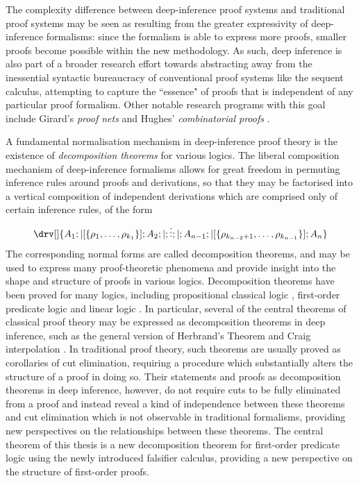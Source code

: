 \documentclass[10pt]{article}
\theoremstyle{definition}\newtheorem{remark}[theorem]{Remark}
\theoremstyle{definition}\newtheorem{example}[theorem]{Example}
\theoremstyle{definition}\newtheorem{definition}[theorem]{Definition}
\begin{document}
	The complexity difference between deep-inference proof systems and traditional proof systems may be seen as resulting from the greater expressivity of deep-inference formalisms: since the formalism is able to express more proofs, smaller proofs become possible within the new methodology. As such, deep inference is also part of a broader research effort towards abstracting away from the inessential syntactic bureaucracy of conventional proof systems like the sequent calculus, attempting to capture the ``essence" of proofs that is independent of any particular proof formalism. Other notable research programs with this goal include Girard's \textit{proof nets} \cite{GirardLinearLogic} and Hughes' \textit{combinatorial proofs} \cite{HughesFirstOrderCombinatorialProofs, HughesProofsWithoutSyntax, HughesCombinatorialProofsDecomposition}.
	
	A fundamental normalisation mechanism in deep-inference proof theory is the existence of \textit{decomposition theorems} for various logics. The liberal composition mechanism of deep-inference formalisms allows for great freedom in permuting inference rules around proofs and derivations, so that they may be factorised into a vertical composition of independent derivations which are comprised only of certain inference rules, of the form
	\[
		\drv[] {
			A_1 ; |[\{\rho_1, \dots, \rho_{k_1}\}] ; A_2 ; | ; \vdots ; | ; A_{n - 1} ; |[\{\rho_{k_{n - 2} + 1}, \dots, \rho_{k_{n - 1}}\}] ; A_n
		}
	\]
	The corresponding normal forms are called decomposition theorems, and may be used to express many proof-theoretic phenomena and provide insight into the shape and structure of proofs in various logics. Decomposition theorems have been proved for many logics, including propositional classical logic \cite{BrunnlerTiuLocalClassical}, first-order predicate logic \cite{HughesCombinatorialProofsDecomposition, KaiThesis} and linear logic \cite{StrassburgerLocalLinear}. In particular, several of the central theorems of classical proof theory may be expressed as decomposition theorems in deep inference, such as the general version of Herbrand's Theorem \cite{KaiCutElimination} and Craig interpolation \cite{BrunnlerInterpolation}. In traditional proof theory, such theorems are usually proved as corollaries of cut elimination, requiring a procedure which substantially alters the structure of a proof in doing so. Their statements and proofs as decomposition theorems in deep inference, however, do not require cuts to be fully eliminated from a proof and instead reveal a kind of independence between these theorems and cut elimination which is not observable in traditional formalisms, providing new perspectives on the relationships between these theorems. The central theorem of this thesis is a new decomposition theorem for first-order predicate logic using the newly introduced falsifier calculus, providing a new perspective on the structure of first-order proofs.
	
\end{document}
